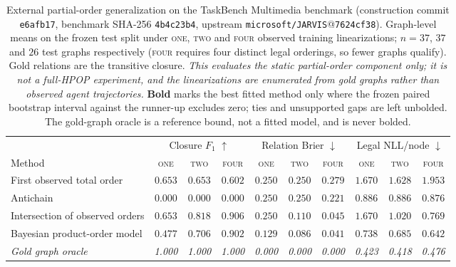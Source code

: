 \begin{table}[t]
\centering
\small
\setlength{\tabcolsep}{5pt}
\caption{%
External partial-order generalization on the TaskBench Multimedia benchmark
(construction commit \texttt{e6afb17}, benchmark SHA-256 \texttt{4b4c23b4},
upstream \texttt{microsoft/JARVIS}@\texttt{7624cf38}). Graph-level means on the
frozen test split under \textsc{one}, \textsc{two} and \textsc{four} observed
training linearizations; $n = 37$, $37$ and $26$ test graphs respectively
(\textsc{four} requires four distinct legal orderings, so fewer graphs qualify).
Gold relations are the transitive closure. \emph{This evaluates the static
partial-order component only; it is not a full-HPOP experiment, and the
linearizations are enumerated from gold graphs rather than observed agent
trajectories.}
\textbf{Bold} marks the best fitted method only where the frozen paired
bootstrap interval against the runner-up excludes zero; ties and unsupported
gaps are left unbolded. The gold-graph oracle is a reference bound, not a
fitted model, and is never bolded.%
}
\label{tab:taskbench-main}
\begin{tabular}{@{}l ccc ccc ccc@{}}
\toprule
& \multicolumn{3}{c}{Closure $F_1$ $\uparrow$}
& \multicolumn{3}{c}{Relation Brier $\downarrow$}
& \multicolumn{3}{c}{Legal NLL/node $\downarrow$} \\
\cmidrule(lr){2-4}\cmidrule(lr){5-7}\cmidrule(lr){8-10}
Method
& \textsc{one} & \textsc{two} & \textsc{four}
& \textsc{one} & \textsc{two} & \textsc{four}
& \textsc{one} & \textsc{two} & \textsc{four} \\
\midrule
First observed total order
  & $0.653$ & $0.653$ & $0.602$
  & $0.250$ & $0.250$ & $0.279$
  & $1.670$ & $1.628$ & $1.953$ \\
Antichain
  & $0.000$ & $0.000$ & $0.000$
  & $0.250$ & $0.250$ & $0.221$
  & $0.886$ & $0.886$ & $0.876$ \\
Intersection of observed orders
  & $\mathbf{0.653}$ & $\mathbf{0.818}$ & $0.906$
  & $0.250$ & $0.110$ & $0.045$
  & $1.670$ & $1.020$ & $0.769$ \\
Bayesian product-order model
  & $0.477$ & $0.706$ & $0.902$
  & $\mathbf{0.129}$ & $\mathbf{0.086}$ & $0.041$
  & $\mathbf{0.738}$ & $\mathbf{0.685}$ & $\mathbf{0.642}$ \\
\midrule
\textit{Gold graph oracle}
  & \textit{1.000} & \textit{1.000} & \textit{1.000}
  & \textit{0.000} & \textit{0.000} & \textit{0.000}
  & \textit{0.423} & \textit{0.418} & \textit{0.476} \\
\bottomrule
\end{tabular}


\end{table}
